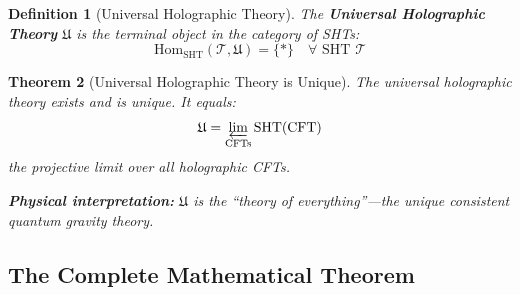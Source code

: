 \documentclass[12pt,a4paper]{article}
\newtheorem{theorem}{Theorem}[section]
\newtheorem{definition}[theorem]{Definition}
\begin{document}
\begin{definition}[Universal Holographic Theory]\label{def:universal-holo}
The \textbf{Universal Holographic Theory} $\mathfrak{U}$ is the terminal object in the category of SHTs:
\begin{equation}
\text{Hom}_{\text{SHT}}(\mathcal{T}, \mathfrak{U}) = \{*\} \quad \forall \text{ SHT } \mathcal{T}
\end{equation}
\end{definition}

\begin{theorem}[Universal Holographic Theory is Unique]\label{thm:universal-unique}
The universal holographic theory exists and is unique. It equals:
\begin{equation}
\mathfrak{U} = \varprojlim_{\text{CFTs}} \text{SHT}(\text{CFT})
\end{equation}
the projective limit over all holographic CFTs.

\textbf{Physical interpretation:} $\mathfrak{U}$ is the ``theory of everything''---the unique consistent quantum gravity theory.
\end{theorem}

\subsection{The Complete Mathematical Theorem}
\end{document}
